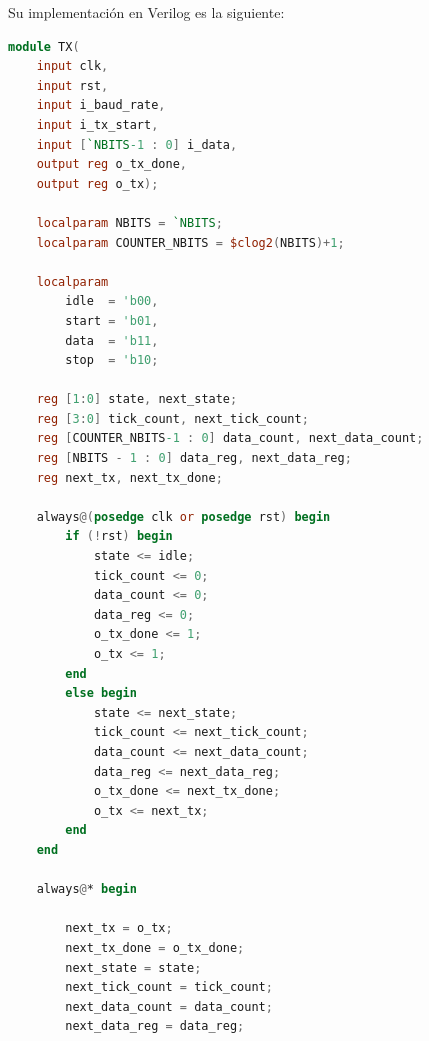 \documentclass{article}
\begin{document}
Su implementación en Verilog es la siguiente:

\begin{lstlisting}[language=Verilog]
module TX(
    input clk,
    input rst,
    input i_baud_rate,
    input i_tx_start,
    input [`NBITS-1 : 0] i_data,
    output reg o_tx_done,
    output reg o_tx);

    localparam NBITS = `NBITS;
    localparam COUNTER_NBITS = $clog2(NBITS)+1;

    localparam
        idle  = 'b00,
        start = 'b01,
        data  = 'b11,
        stop  = 'b10;

    reg [1:0] state, next_state;
    reg [3:0] tick_count, next_tick_count;
    reg [COUNTER_NBITS-1 : 0] data_count, next_data_count;
    reg [NBITS - 1 : 0] data_reg, next_data_reg;
    reg next_tx, next_tx_done;

    always@(posedge clk or posedge rst) begin
        if (!rst) begin
            state <= idle;
            tick_count <= 0;
            data_count <= 0;
            data_reg <= 0;
            o_tx_done <= 1;
            o_tx <= 1;
        end
        else begin
            state <= next_state;
            tick_count <= next_tick_count;
            data_count <= next_data_count;
            data_reg <= next_data_reg;
            o_tx_done <= next_tx_done;
            o_tx <= next_tx;
        end
    end

    always@* begin
        
        next_tx = o_tx;
        next_tx_done = o_tx_done;
        next_state = state;
        next_tick_count = tick_count;
        next_data_count = data_count;
        next_data_reg = data_reg;


\end{lstlisting}
\end{document}
